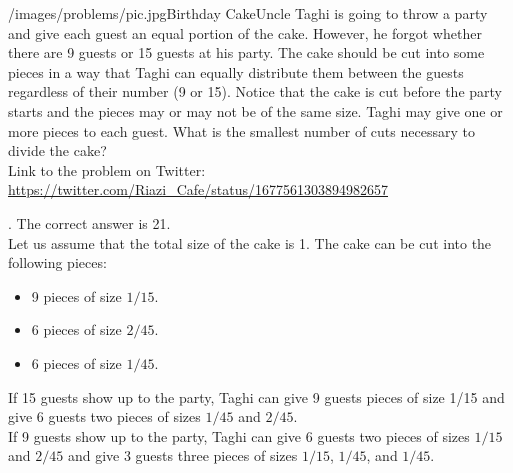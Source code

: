 \begin{problem}{/images/problems/pic.jpg}{Birthday Cake}Uncle Taghi is going to throw a party and give each guest an equal portion of the cake. However, he forgot whether there are 9 guests or 15 guests at his party. The cake should be cut into some pieces in a way that Taghi can equally distribute them between the guests regardless of their number (9 or 15). Notice that the cake is cut before the party starts and the pieces may or may not be of the same size. Taghi may give one or more pieces to each guest. What is the smallest number of cuts necessary to divide the cake?\\[0.2cm]

Link to the problem on Twitter:  \url{https://twitter.com/Riazi_Cafe/status/1677561303894982657}\end{problem}
\begin{solution}.
The correct answer is 21.\\[0.2cm]

Let us assume that the total size of the cake is 1. The cake can be cut into the following pieces:
\begin{itemize}
\item 9 pieces of size $1/15$.
\item 6 pieces of size $2/45$.
\item 6 pieces of size $1/45$.
\end{itemize}

If 15 guests show up to the party, Taghi can give 9 guests pieces of size  1/15 and give 6 guests two pieces of sizes $1/45$ and $2/45$.\\
If 9 guests show up to the party, Taghi can give 6 guests two pieces of sizes  $1/15$ and $2/45$ and give 3 guests three pieces of sizes $1/15$, $1/45$, and $1/45$.

\end{solution}
